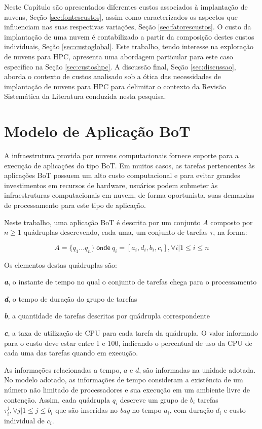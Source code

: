 \documentclass[tese,capa]{texufpel}
\begin{document}
Neste Capítulo são apresentados diferentes custos associados à implantação de nuvens, Seção \ref{sec:fontescustos}, assim como caracterizados os aspectos que influenciam nas suas respectivas variações, Seção \ref{sec:fatorescustos}. O custo da implantação de uma nuvem é contabilizado a partir da composição destes custos individuais, Seção \ref{sec:custoglobal}. Este trabalho, tendo interesse na exploração de nuvens para HPC, apresenta uma abordagem particular para este caso específico na Seção \ref{sec:custoshpc}. A discussão final, Seção \ref{sec:discussao}, aborda o contexto de custos analisado sob a ótica das necessidades de implantação de nuvens para HPC para delimitar o contexto da Revisão Sistemática da Literatura conduzida nesta pesquisa.

\section{Modelo de Aplicação BoT}\label{sec:modelo_de_aplicacao_bot}

A infraestrutura provida por nuvens computacionais fornece suporte para a execução de aplicações do tipo BoT. Em muitos casos, as tarefas pertencentes às aplicações BoT possuem um alto custo computacional e para evitar grandes investimentos em recursos de hardware, usuários podem submeter às infraestruturas computacionais em nuvem, de forma oportunista, suas demandas de processamento para este tipo de aplicação.

Neste trabalho, uma aplicação BoT é descrita por um conjunto $A$ composto por $n \ge 1$ quádruplas descrevendo, cada uma, um conjunto de tarefas $\tau$, na forma:

\[
A = \{q_1 \dots q_n\} ~\textsf{onde}~ q_i = [a_i,d_i,b_i,c_i], \forall  i | 1 \le  i \le n
\]

Os elementos destas quádruplas são:
\begin{enumerate*}[itemjoin={{; }},itemjoin*={{; e }}]
	\item[]\textbf{\emph{a}}, o instante de tempo no qual o conjunto de tarefas chega para o processamento
	\item[]\textbf{\emph{d}}, o tempo de duração do grupo de tarefas
	\item[]\textbf{\emph{b}}, a quantidade de tarefas descritas por quádrupla correspondente
	\item[]\textbf{\emph{c}}, a taxa de utilização de CPU para cada tarefa da quádrupla. O valor informado para o custo deve estar entre 1 e 100, indicando o percentual de uso da CPU de cada uma das tarefas quando em execução.
\end{enumerate*}
As informações relacionadas a tempo, $a$ e $d$, são informadas na unidade adotada. No modelo adotado, as informações de tempo consideram a existência de um número não limitado de processadores e sua execução em um ambiente livre de contenção. Assim, cada quádrupla $q_i$ descreve um grupo de $b_i$ tarefas $\tau_i^j, \forall j | 1 \le j \le b_i$ que são inseridas no \textit{bag} no tempo $a_i$, com duração $d_i$ e custo individual de $c_i$.
\end{document}
